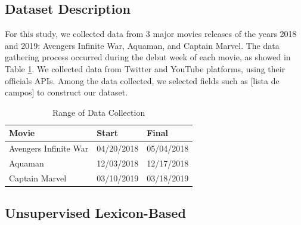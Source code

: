 \subsection{Dataset Description}

For this study, we collected data from 3 major movies releases of the years 2018 and 2019: Avengers Infinite War, Aquaman, and Captain Marvel. The data gathering process occurred during the debut week of each movie, as showed in Table \ref{tab:range_data}. We collected data from Twitter and YouTube platforms, using their officials APIs. Among the data collected, we selected fields such as [lista de campos] to construct our dataset.  

\begin{table}[h]
    \small{}
    \begin{tabular}{ p{4cm}|p{1.5cm}|p{1.5cm} }
        \hline
            \textbf{Movie} & \textbf{Start} & \textbf{Final}\\
        \hline
            Avengers Infinite War & 04/20/2018  & 05/04/2018 \\
            Aquaman & 12/03/2018 & 12/17/2018  \\
            Captain Marvel & 03/10/2019 & 03/18/2019 \\
        \hline
    \end{tabular}
    \caption{Range of Data Collection}
    \label{tab:range_data}
\end{table}
    
\subsection{Unsupervised Lexicon-Based}



